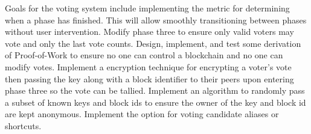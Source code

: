 \documentclass[conference]{IEEEtran}
\begin{document}
Goals for the voting system include implementing the metric for determining when a phase has finished. This will allow smoothly transitioning between phases without user intervention. Modify phase three to ensure only valid voters may vote and only the last vote counts. Design, implement, and test some derivation of Proof-of-Work to ensure no one can control a blockchain and no one can modify votes. Implement a encryption technique for encrypting a voter's vote then passing the key along with a block identifier to their peers upon entering phase three so the vote can be tallied. Implement an algorithm to randomly pass a subset of known keys and block ids to ensure the owner of the key and block id are kept anonymous. Implement the option for voting candidate aliases or shortcuts.

%
%



%
%
\end{document}
